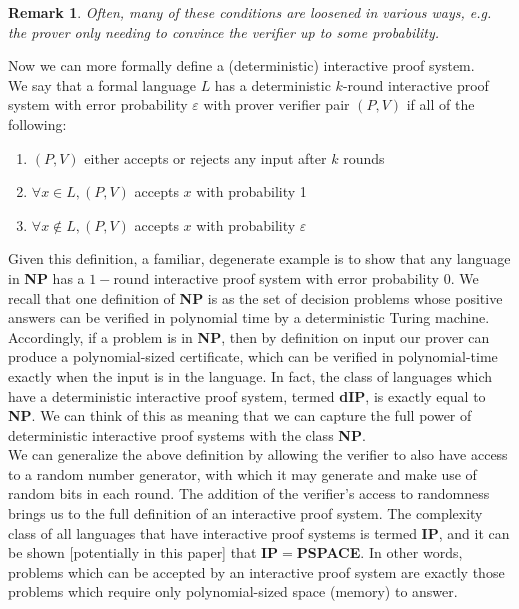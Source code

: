 \documentclass[12pt]{article}
\newtheorem{rmk}{Remark}
\numberwithin{thm}{section}
\numberwithin{defn}{section}
\numberwithin{prop}{section}
\numberwithin{rmk}{section}
\begin{document}
	\begin{rmk} Often, many of these conditions are loosened in various ways, e.g. the prover only needing to convince the verifier up to some probability.\end{rmk}
	
	Now we can more formally define a (deterministic) interactive proof system.\\
	
	We say that a formal language $L$ has a  deterministic $k$-round interactive proof system with error probability $\varepsilon$ with prover verifier pair $(P,V)$ if all of the following:
	\begin{enumerate}
		\item $(P,V)$ either accepts or rejects any input after $k$ rounds
		\item $\forall x\in L, (P,V)$ accepts $x$ with probability 1
		\item $\forall x\notin L, (P,V)$ accepts $x$ with probability $\varepsilon$ 
	\end{enumerate}
	
	Given this definition, a familiar, degenerate example is to show that any language in \textbf{NP} has a $1-$round interactive proof system with error probability $0$. We recall that one definition of \textbf{NP} is as the set of decision problems whose positive answers can be verified in polynomial time by a deterministic Turing machine. Accordingly, if a problem is in \textbf{NP}, then by definition on input our prover can produce a polynomial-sized certificate, which can be verified in polynomial-time exactly when the input is in the language. In fact, the class of languages which have a deterministic interactive proof system, termed \textbf{dIP}, is exactly equal to \textbf{NP}. We can think of this as meaning that we can capture the full power of deterministic interactive proof systems with the class \textbf{NP}.\\
	
	We can generalize the above definition by allowing the verifier to also have access to a random number generator, with which it may generate and make use of random bits in each round. The addition of the verifier's access to randomness brings us to the full definition of an interactive proof system. The complexity class of all languages that have interactive proof systems is termed \textbf{IP}, and it can be shown [potentially in this paper] that \textbf{IP}$=$\textbf{PSPACE}. In other words, problems which can be accepted by an interactive proof system are exactly those problems which require only polynomial-sized space (memory) to answer. 
\end{document}
